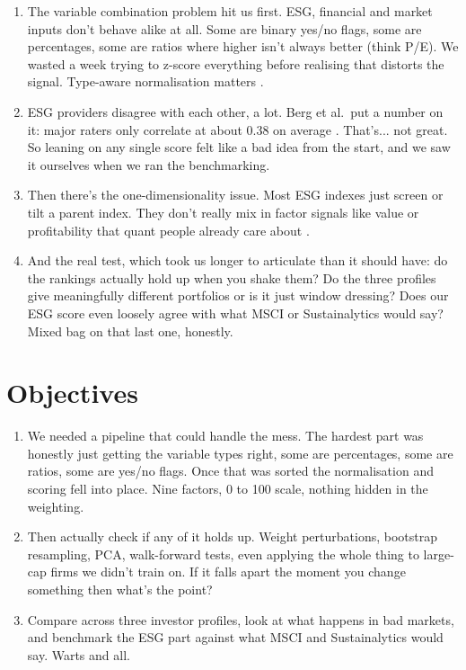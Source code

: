 \begin{enumerate}
    \item The variable combination problem hit us first. ESG, financial and market inputs don't behave alike at all. Some are binary yes/no flags, some are percentages, some are ratios where higher isn't always better (think P/E). We wasted a week trying to z-score everything before realising that distorts the signal. Type-aware normalisation matters \cite{oecd_2008}.
    \item ESG providers disagree with each other, a lot. Berg et al.\ put a number on it: major raters only correlate at about 0.38 on average \cite{berg_koelbel_rigobon_2022, chatterji_durand_levine_touboul_2016, gibson_krueger_schmidt_2021}. That's... not great. So leaning on any single score felt like a bad idea from the start, and we saw it ourselves when we ran the benchmarking.
    \item Then there's the one-dimensionality issue. Most ESG indexes just screen or tilt a parent index. They don't really mix in factor signals like value or profitability that quant people already care about \cite{sp_global_esg, fama_french_1993, fama_french_2015, carhart_1997}.
    \item And the real test, which took us longer to articulate than it should have: do the rankings actually hold up when you shake them? Do the three profiles give meaningfully different portfolios or is it just window dressing? Does our ESG score even loosely agree with what MSCI or Sustainalytics would say? Mixed bag on that last one, honestly.
\end{enumerate}

\section{Objectives}

\begin{enumerate}
    \item We needed a pipeline that could handle the mess. The hardest part was honestly just getting the variable types right, some are percentages, some are ratios, some are yes/no flags. Once that was sorted the normalisation and scoring fell into place. Nine factors, 0 to 100 scale, nothing hidden in the weighting.
    \item Then actually check if any of it holds up. Weight perturbations, bootstrap resampling, PCA, walk-forward tests, even applying the whole thing to large-cap firms we didn't train on. If it falls apart the moment you change something then what's the point?
    \item Compare across three investor profiles, look at what happens in bad markets, and benchmark the ESG part against what MSCI and Sustainalytics would say. Warts and all.
\end{enumerate}

